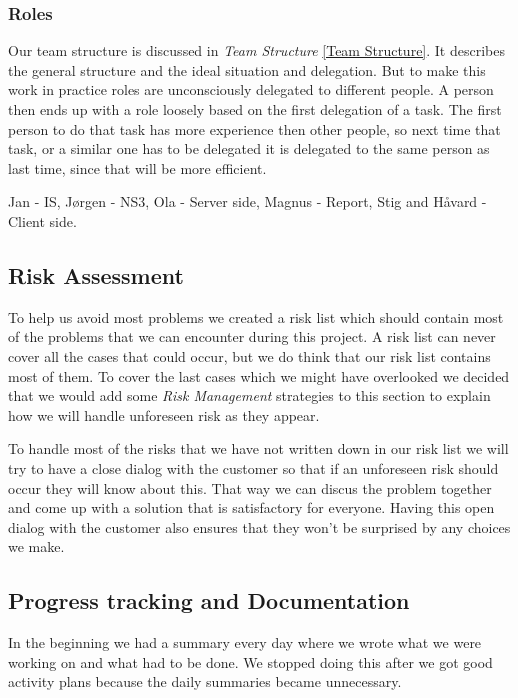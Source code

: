     \subsubsection{Roles}\label{roles}
    Our team structure is discussed in \textit{Team Structure} \ref{Team Structure}. It describes the general structure and the ideal situation and delegation. 
    But to make this work in practice roles are unconsciously delegated to different people. A person then ends up with a role loosely based on the first delegation of a task. The first person to do that task has more experience then other people, so next time that task, or a similar one has to be delegated it is delegated to the same person as last time, since that will be more efficient. 
        
     Jan - IS, Jørgen - NS3, Ola - Server side, Magnus - Report, Stig and Håvard - Client side.
         
    \subsection{Risk Assessment}\label{Risk Assessment}
     To help us avoid most problems we created a risk list which should contain most of the problems that we can encounter during this project. A risk list can never cover all the cases that could occur, but we do think that our risk list contains most of them. To cover the last cases which we might have overlooked we decided that we would add some \textit{Risk Management} strategies to this section to explain how we will handle unforeseen risk as they appear. 
     
     To handle most of the risks that we have not written down in our risk list we will try to have a close dialog with the customer so that if an unforeseen risk should occur they will know about this. That way we can discus the problem together and come up with a solution that is satisfactory for everyone. Having this open dialog with the customer also ensures that they won't be surprised by any choices we make.

    \subsection{Progress tracking and Documentation}\label{Progress tracking and Documentation}
    In the beginning we had a summary every day where we wrote what we were working on and what had to be done. We stopped doing this after we got good activity plans because the daily summaries became unnecessary. 
    
